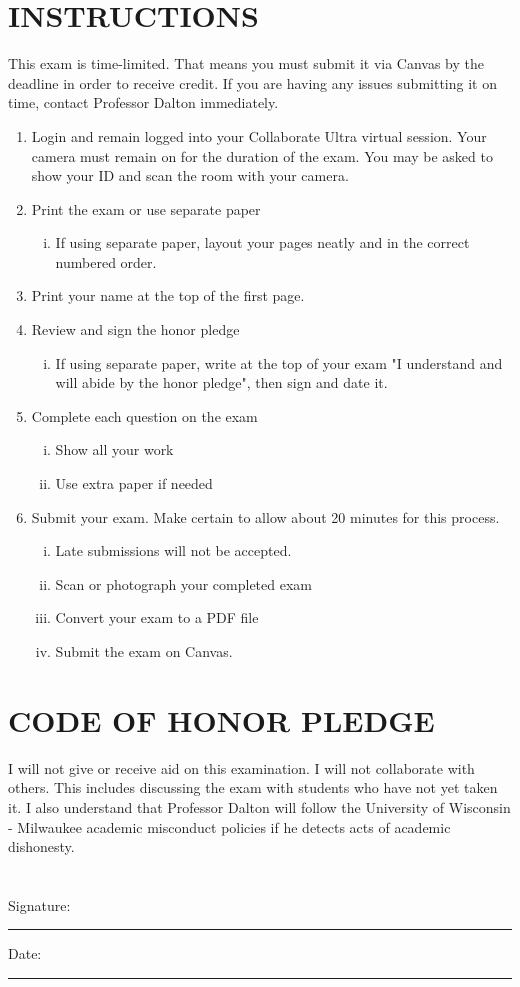 \documentclass[12pt,letterpaper]{article}
\begin{document}
\section*{INSTRUCTIONS}
This exam is time-limited. That means you must submit it via Canvas by the deadline in order to receive credit. If you are having any issues submitting it on time, contact Professor Dalton immediately.
\begin{enumerate}
	\item Login and remain logged into your Collaborate Ultra virtual session. Your camera must remain on for the duration of the exam. You may be asked to show your ID and scan the room with your camera.
	\item Print the exam or use separate paper
	\begin{enumerate}[(i)]
		\item If using separate paper, layout your pages neatly and in the correct numbered order.
	\end{enumerate}
	\item Print your name at the top of the first page.
	\item Review and sign the honor pledge
	\begin{enumerate}[(i)]
		\item If using separate paper, write at the top of your exam "I understand and will abide by the honor pledge", then sign and date it.
	\end{enumerate}
	\item Complete each question on the exam
	\begin{enumerate}[(i)]
		\item Show all your work
		\item Use extra paper if needed
	\end{enumerate}
	\item Submit your exam. Make certain to allow about 20 minutes for this process.
	\begin{enumerate}[(i)]
		\item Late submissions will not be accepted.
		\item Scan or photograph your completed exam
		\item Convert your exam to a PDF file
		\item Submit the exam on Canvas.
	\end{enumerate}
\end{enumerate}

\section*{CODE OF HONOR PLEDGE}

I will not give or receive aid on this examination. I will not collaborate with others. This includes discussing the exam with students who have not yet taken it. I also understand that Professor Dalton will follow the University of Wisconsin - Milwaukee academic misconduct policies if he detects acts of academic dishonesty.
\\\\\\
Signature:\rule{8cm}{0.4pt} Date:\rule{4cm}{0.4pt}
\end{document}
